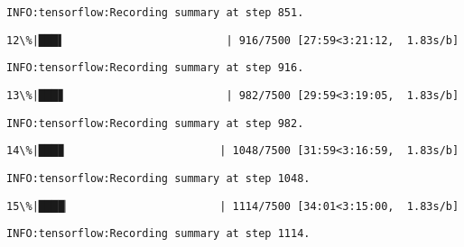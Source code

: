 \documentclass[11pt]{article}
\begin{document}
    \begin{Verbatim}[commandchars=\\\{\}]
INFO:tensorflow:Recording summary at step 851.

    \end{Verbatim}

    \begin{Verbatim}[commandchars=\\\{\}]
 12\%|███▌                         | 916/7500 [27:59<3:21:12,  1.83s/b]
    \end{Verbatim}

    \begin{Verbatim}[commandchars=\\\{\}]
INFO:tensorflow:Recording summary at step 916.

    \end{Verbatim}

    \begin{Verbatim}[commandchars=\\\{\}]
 13\%|███▊                         | 982/7500 [29:59<3:19:05,  1.83s/b]
    \end{Verbatim}

    \begin{Verbatim}[commandchars=\\\{\}]
INFO:tensorflow:Recording summary at step 982.

    \end{Verbatim}

    \begin{Verbatim}[commandchars=\\\{\}]
 14\%|███▉                        | 1048/7500 [31:59<3:16:59,  1.83s/b]
    \end{Verbatim}

    \begin{Verbatim}[commandchars=\\\{\}]
INFO:tensorflow:Recording summary at step 1048.

    \end{Verbatim}

    \begin{Verbatim}[commandchars=\\\{\}]
 15\%|████▏                       | 1114/7500 [34:01<3:15:00,  1.83s/b]
    \end{Verbatim}

    \begin{Verbatim}[commandchars=\\\{\}]
INFO:tensorflow:Recording summary at step 1114.

    \end{Verbatim}
\end{document}
